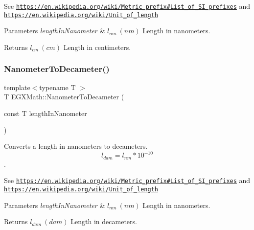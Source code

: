 See \href{https://en.wikipedia.org/wiki/Metric_prefix#List_of_SI_prefixes}{\tt https\+://en.\+wikipedia.\+org/wiki/\+Metric\+\_\+prefix\#\+List\+\_\+of\+\_\+\+S\+I\+\_\+prefixes} and \href{https://en.wikipedia.org/wiki/Unit_of_length}{\tt https\+://en.\+wikipedia.\+org/wiki/\+Unit\+\_\+of\+\_\+length} 
\begin{DoxyParams}{Parameters}
{\em length\+In\+Nanometer} & $ l_{nm}\ (nm)$ Length in nanometers. \\
\hline
\end{DoxyParams}
\begin{DoxyReturn}{Returns}
$ l_{cm}\ (cm)$ Length in centimeters. 
\end{DoxyReturn}
\mbox{\label{group___e_g_x_math-_conversions-_length_conversions-_s_i-_nanometer-_s_i_gabd4fa6935aab15cac606410d0da3b22d}} 
\subsubsection{\texorpdfstring{Nanometer\+To\+Decameter()}{NanometerToDecameter()}}
{\footnotesize\ttfamily template$<$typename T $>$ \\
T E\+G\+X\+Math\+::\+Nanometer\+To\+Decameter (\begin{DoxyParamCaption}\item[{const T}]{length\+In\+Nanometer }\end{DoxyParamCaption})}



Converts a length in nanometers to decameters. \[ l_{dam}=l_{nm} * 10^{-10} \]. 

See \href{https://en.wikipedia.org/wiki/Metric_prefix#List_of_SI_prefixes}{\tt https\+://en.\+wikipedia.\+org/wiki/\+Metric\+\_\+prefix\#\+List\+\_\+of\+\_\+\+S\+I\+\_\+prefixes} and \href{https://en.wikipedia.org/wiki/Unit_of_length}{\tt https\+://en.\+wikipedia.\+org/wiki/\+Unit\+\_\+of\+\_\+length} 
\begin{DoxyParams}{Parameters}
{\em length\+In\+Nanometer} & $ l_{nm}\ (nm)$ Length in nanometers. \\
\hline
\end{DoxyParams}
\begin{DoxyReturn}{Returns}
$ l_{dam}\ (dam)$ Length in decameters. 
\end{DoxyReturn}
\mbox{\label{group___e_g_x_math-_conversions-_length_conversions-_s_i-_nanometer-_s_i_ga3be41b7dc346f2f5745d761c9f6c743d}} 
